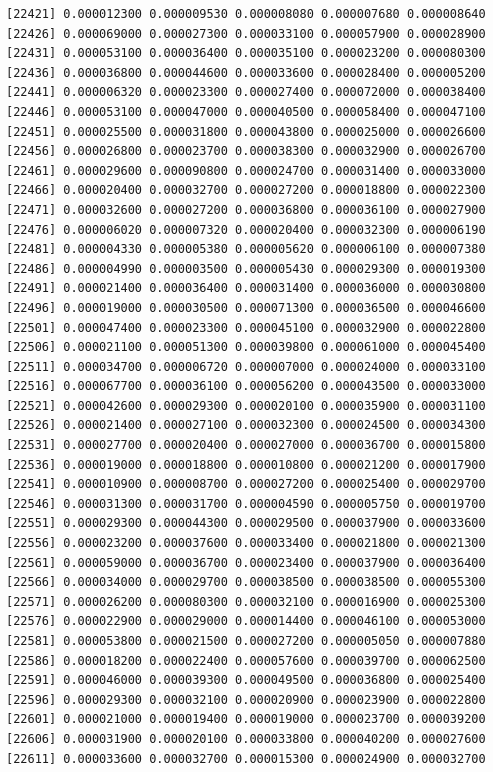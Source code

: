 \documentclass[]{article}
\begin{document}
\begin{verbatim}
[22421] 0.000012300 0.000009530 0.000008080 0.000007680 0.000008640
[22426] 0.000069000 0.000027300 0.000033100 0.000057900 0.000028900
[22431] 0.000053100 0.000036400 0.000035100 0.000023200 0.000080300
[22436] 0.000036800 0.000044600 0.000033600 0.000028400 0.000005200
[22441] 0.000006320 0.000023300 0.000027400 0.000072000 0.000038400
[22446] 0.000053100 0.000047000 0.000040500 0.000058400 0.000047100
[22451] 0.000025500 0.000031800 0.000043800 0.000025000 0.000026600
[22456] 0.000026800 0.000023700 0.000038300 0.000032900 0.000026700
[22461] 0.000029600 0.000090800 0.000024700 0.000031400 0.000033000
[22466] 0.000020400 0.000032700 0.000027200 0.000018800 0.000022300
[22471] 0.000032600 0.000027200 0.000036800 0.000036100 0.000027900
[22476] 0.000006020 0.000007320 0.000020400 0.000032300 0.000006190
[22481] 0.000004330 0.000005380 0.000005620 0.000006100 0.000007380
[22486] 0.000004990 0.000003500 0.000005430 0.000029300 0.000019300
[22491] 0.000021400 0.000036400 0.000031400 0.000036000 0.000030800
[22496] 0.000019000 0.000030500 0.000071300 0.000036500 0.000046600
[22501] 0.000047400 0.000023300 0.000045100 0.000032900 0.000022800
[22506] 0.000021100 0.000051300 0.000039800 0.000061000 0.000045400
[22511] 0.000034700 0.000006720 0.000007000 0.000024000 0.000033100
[22516] 0.000067700 0.000036100 0.000056200 0.000043500 0.000033000
[22521] 0.000042600 0.000029300 0.000020100 0.000035900 0.000031100
[22526] 0.000021400 0.000027100 0.000032300 0.000024500 0.000034300
[22531] 0.000027700 0.000020400 0.000027000 0.000036700 0.000015800
[22536] 0.000019000 0.000018800 0.000010800 0.000021200 0.000017900
[22541] 0.000010900 0.000008700 0.000027200 0.000025400 0.000029700
[22546] 0.000031300 0.000031700 0.000004590 0.000005750 0.000019700
[22551] 0.000029300 0.000044300 0.000029500 0.000037900 0.000033600
[22556] 0.000023200 0.000037600 0.000033400 0.000021800 0.000021300
[22561] 0.000059000 0.000036700 0.000023400 0.000037900 0.000036400
[22566] 0.000034000 0.000029700 0.000038500 0.000038500 0.000055300
[22571] 0.000026200 0.000080300 0.000032100 0.000016900 0.000025300
[22576] 0.000022900 0.000029000 0.000014400 0.000046100 0.000053000
[22581] 0.000053800 0.000021500 0.000027200 0.000005050 0.000007880
[22586] 0.000018200 0.000022400 0.000057600 0.000039700 0.000062500
[22591] 0.000046000 0.000039300 0.000049500 0.000036800 0.000025400
[22596] 0.000029300 0.000032100 0.000020900 0.000023900 0.000022800
[22601] 0.000021000 0.000019400 0.000019000 0.000023700 0.000039200
[22606] 0.000031900 0.000020100 0.000033800 0.000040200 0.000027600
[22611] 0.000033600 0.000032700 0.000015300 0.000024900 0.000032700

\end{verbatim}
\end{document}
